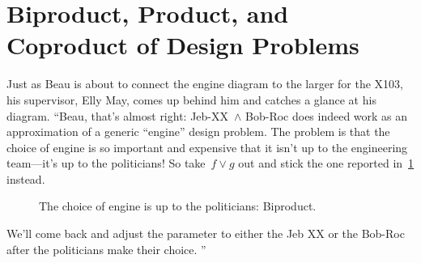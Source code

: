 
\section{Biproduct, Product, and Coproduct of Design Problems}
\begin{example}
    Just as Beau is about to connect the engine diagram to the larger  for the X103, his supervisor, Elly May, comes up behind him and catches a glance at his diagram.
    ``Beau, that's almost right: Jeb-XX~$\wedge$ Bob-Roc does indeed work as an approximation of a generic ``engine'' design problem.
    The problem is that the choice of engine is so important and expensive that it isn't up to the engineering team---it's up to the politicians!
    So take~$f \vee g$ out and stick the one reported in~\cref{fig:exbiproduct} instead.
    \begin{figure}[h!]
        \begin{center}
        \end{center}
        \caption{The choice of engine is up to the politicians: Biproduct.}
        \label{fig:exbiproduct}
    \end{figure}

    We'll come back and adjust the parameter to either the Jeb XX or the Bob-Roc after the politicians make their choice.
    ''
\end{example}
